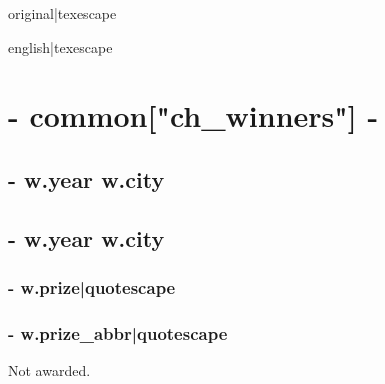 {%

{%
{%
{{ original|texescape }} {%
{%
{ } \textbar{} {{ english|texescape }}
{%
 {%
{%
{%

{%
{%
{%
{%
{%
{%
{%
{%
{%
{%

{%
\chapter{ {{- common["ch_winners"] -}} }
{%
{%
    \section*{ {{- w.year }} {{ w.city }} }
{%
    \section*{ {{- w.year }} {{ w.city }} }
{%
{%
        {%
           \subsection*{ {{- w.prize|quotescape }} }
        {%
            \subsection*{ {{- w.prize_abbr|quotescape }} }
        {%
{%
{%
Not awarded.
{%
}}}}}}}}}}}}}}}}}}}}}}}}}}}}}}}
